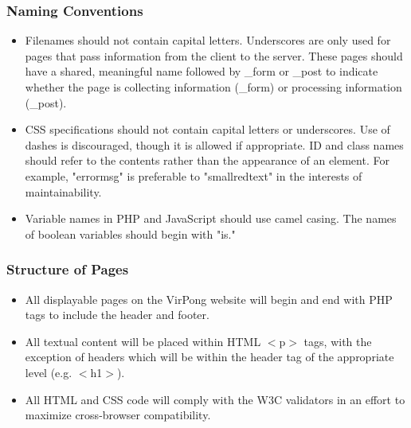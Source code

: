 		\subsubsection{Naming Conventions}
		\begin{itemize}
			\item Filenames should not contain capital letters. Underscores are only used for pages that pass information from the client to the server. These pages should have a shared, meaningful name followed by \_form or \_post to indicate whether the page is collecting information (\_form) or processing information (\_post).
			\item CSS specifications should not contain capital letters or underscores. Use of dashes is discouraged, though it is allowed if appropriate. ID and class names should refer to the contents rather than the appearance of an element. For example, "errormsg" is preferable to "smallredtext" in the interests of maintainability.
			\item Variable names in PHP and JavaScript should use camel casing. The names of boolean variables should begin with "is."
		\end{itemize}
			
		\subsubsection{Structure of Pages}
		\begin{itemize}
			\item All displayable pages on the VirPong website will begin and end with PHP tags to include the header and footer.
			\item All textual content will be placed within HTML $<$p$>$ tags, with the exception of headers which will be within the header tag of the appropriate level (e.g. $<$h1$>$).
			\item All HTML and CSS code will comply with the W3C validators in an effort to maximize cross-browser compatibility.
		\end{itemize}
			

